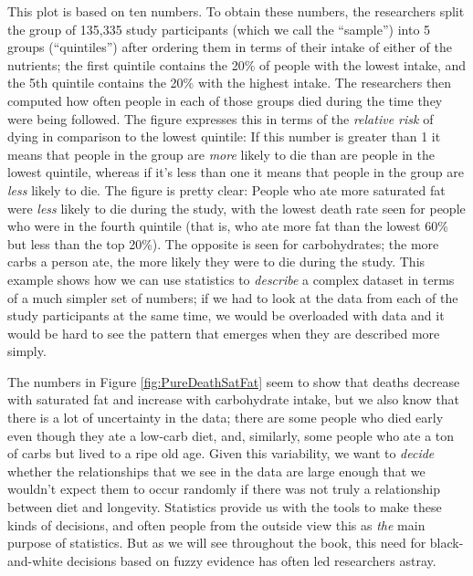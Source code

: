 \documentclass[12pt,]{book}
\theoremstyle{definition}
\theoremstyle{definition}
\theoremstyle{definition}
\theoremstyle{remark}
\begin{document}
This plot is based on ten numbers. To obtain these numbers, the researchers split the group of 135,335 study participants (which we call the ``sample'') into 5 groups (``quintiles'') after ordering them in terms of their intake of either of the nutrients; the first quintile contains the 20\% of people with the lowest intake, and the 5th quintile contains the 20\% with the highest intake. The researchers then computed how often people in each of those groups died during the time they were being followed. The figure expresses this in terms of the \emph{relative risk} of dying in comparison to the lowest quintile: If this number is greater than 1 it means that people in the group are \emph{more} likely to die than are people in the lowest quintile, whereas if it's less than one it means that people in the group are \emph{less} likely to die. The figure is pretty clear: People who ate more saturated fat were \emph{less} likely to die during the study, with the lowest death rate seen for people who were in the fourth quintile (that is, who ate more fat than the lowest 60\% but less than the top 20\%). The opposite is seen for carbohydrates; the more carbs a person ate, the more likely they were to die during the study. This example shows how we can use statistics to \emph{describe} a complex dataset in terms of a much simpler set of numbers; if we had to look at the data from each of the study participants at the same time, we would be overloaded with data and it would be hard to see the pattern that emerges when they are described more simply.

The numbers in Figure \ref{fig:PureDeathSatFat} seem to show that deaths decrease with saturated fat and increase with carbohydrate intake, but we also know that there is a lot of uncertainty in the data; there are some people who died early even though they ate a low-carb diet, and, similarly, some people who ate a ton of carbs but lived to a ripe old age. Given this variability, we want to \emph{decide} whether the relationships that we see in the data are large enough that we wouldn't expect them to occur randomly if there was not truly a relationship between diet and longevity. Statistics provide us with the tools to make these kinds of decisions, and often people from the outside view this as \emph{the} main purpose of statistics. But as we will see throughout the book, this need for black-and-white decisions based on fuzzy evidence has often led researchers astray.
\end{document}
